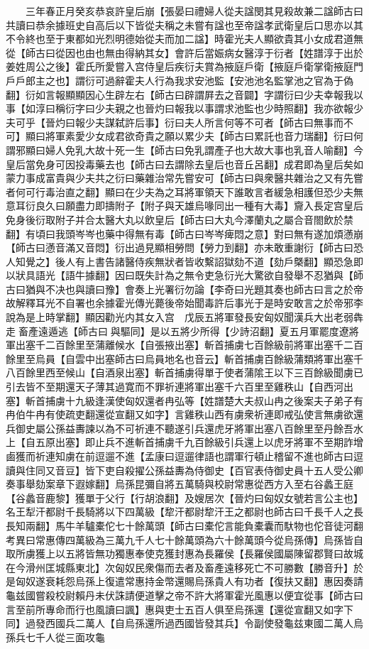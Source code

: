 　　三年春正月癸亥恭哀許皇后崩【張晏曰禮婦人從夫諡閔其見殺故兼二諡師古曰共讀曰恭余據班史自高后以下皆從夫稱之未嘗有諡也至帝諡孝武衛皇后口思亦以其不令終也至于東都如光烈明德始從夫而加二諡】時霍光夫人顯欲貴其小女成君道無從【師古曰從因也由也無由得納其女】會許后當娠病女醫淳于衍者【姓譜淳于出於姜姓周公之後】霍氏所愛嘗入宫侍皇后疾衍夫賞為掖庭戶衛【掖庭戶衛掌衛掖庭門戶戶郎主之也】謂衍可過辭霍夫人行為我求安池監【安池池名監掌池之官為于偽翻】衍如言報顯顯因心生辟左右【師古曰辟謂屛去之音闢】字謂衍曰少夫幸報我以事【如淳曰稱衍字曰少夫親之也晉灼曰報我以事謂求池監也少時照翻】我亦欲報少夫可乎【晉灼曰報少夫謀弑許后事】衍曰夫人所言何等不可者【師古曰無事而不可】顯曰將軍素愛少女成君欲奇貴之願以累少夫【師古曰累託也音力瑞翻】衍曰何謂邪顯曰婦人免乳大故十死一生【師古曰免乳謂產子也大故大事也乳音人喻翻】今皇后當免身可因投毒藥去也【師古曰去謂除去皇后也音丘呂翻】成君即為皇后矣如蒙力事成富貴與少夫共之衍曰藥雜治常先嘗安可【師古曰與衆醫共雜治之又有先嘗者何可行毒治直之翻】顯曰在少夫為之耳將軍領天下誰敢言者緩急相護但恐少夫無意耳衍良久曰願盡力即擣附子【附子與天雄烏喙同出一種有大毒】齎入長定宫皇后免身後衍取附子并合太醫大丸以飲皇后【師古曰大丸今澤蘭丸之屬合音閤飲於禁翻】有頃曰我頭岑岑也藥中得無有毒【師古曰岑岑痺悶之意】對曰無有遂加煩懣崩【師古曰懣音滿又音悶】衍出過見顯相勞問【勞力到翻】亦未敢重謝衍【師古曰恐人知覺之】後人有上書告諸醫侍疾無狀者皆收繫詔獄劾不道【劾戶槩翻】顯恐急即以狀具語光【語牛據翻】因曰既失計為之無令吏急衍光大驚欲自發舉不忍猶與【師古曰猶與不决也與讀曰豫】會奏上光署衍勿論【李奇曰光題其奏也師古曰言之於帝故解釋耳光不自署也余據霍光傳光薨後帝始聞毒許后事光于是時安敢言之於帝邪李說為是上時掌翻】顯因勸光内其女入宫　戊辰五將軍發長安匈奴聞漢兵大出老弱犇走畜產遠遁逃【師古曰與驅同】是以五將少所得【少詩沼翻】夏五月軍罷度遼將軍出塞千二百餘里至蒲離候水【自張掖出塞】斬首捕虜七百餘級前將軍出塞千二百餘里至烏員【自雲中出塞師古曰烏員地名也音云】斬首捕虜百餘級蒲類將軍出塞千八百餘里西至候山【自酒泉出塞】斬首捕虜得單于使者蒲隂王以下三百餘級聞虜已引去皆不至期還天子薄其過寛而不罪祈連將軍出塞千六百里至雞秩山【自西河出塞】斬首捕虜十九級逢漢使匈奴還者冉弘等【姓譜楚大夫叔山冉之後案夫子弟子有冉伯牛冉有使疏吏翻還從宣翻又如字】言雞秩山西有虜衆祈連即戒弘使言無虜欲還兵御史屬公孫益夀諫以為不可祈連不聽遂引兵還虎牙將軍出塞八百餘里至丹餘吾水上【自五原出塞】即止兵不進斬首捕虜千九百餘級引兵還上以虎牙將軍不至期詐增鹵獲而祈連知虜在前逗遛不進【孟康曰逗遛律語也謂軍行頓止稽留不進也師古曰逗讀與住同又音豆】皆下吏自殺擢公孫益夀為侍御史【百官表侍御史員十五人受公卿奏事舉劾案章下遐嫁翻】烏孫昆彌自將五萬騎與校尉常惠從西方入至右谷蠡王庭【谷蠡音鹿黎】獲單于父行【行胡浪翻】及嫂居次【晉灼曰匈奴女號若言公主也】名王犁汗都尉千長騎將以下四萬級【犂汗都尉犂汗王之都尉也師古曰千長千人之長長知兩翻】馬牛羊驢橐佗七十餘萬頭【師古曰橐佗言能負橐囊而馱物也佗音徒河翻　考異曰常惠傳四萬級為三萬九千人七十餘萬頭為六十餘萬頭今從烏孫傳】烏孫皆自取所虜獲上以五將皆無功獨惠奉使克獲封惠為長羅侯【長羅侯國屬陳留郡賢曰故城在今滑州匡城縣東北】次匈奴民衆傷而去者及畜產遠移死亡不可勝數【勝音升】於是匈奴遂衰耗怨烏孫上復遣常惠持金幣還賜烏孫貴人有功者【復扶又翻】惠因奏請龜兹國嘗殺校尉賴丹未伏誅請便道擊之帝不許大將軍霍光風惠以便宜從事【師古曰言至前所專命而行也風讀曰諷】惠與吏士五百人俱至烏孫還【還從宣翻又如字下同】過發西國兵二萬人【自烏孫還所過西國皆發其兵】令副使發龜兹東國二萬人烏孫兵七千人從三面攻龜